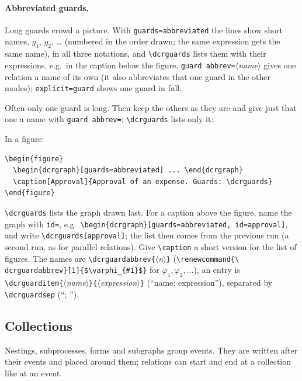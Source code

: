 \documentclass[a4paper,11pt]{article}
\newcommand\example[1]{%
  \begin{tcolorbox}[colback=white, colframe=black!25, boxrule=0.4pt,
      arc=1mm, left=2mm, right=2mm, halign lower=flush center]
    
    \tcblower
    
  \end{tcolorbox}}
\newcommand\cs[1]{\texttt{\textbackslash#1}}
\newcommand\key[1]{\texttt{#1}}
\newcommand\meta[1]{\ensuremath{\langle}\textit{#1}\ensuremath{\rangle}}
\newcommand\marg[1]{\texttt{\{}\meta{#1}\texttt{\}}}
\begin{document}
\paragraph{Abbreviated guards.} Long guards crowd a picture. With
\key{guards=abbreviated} the lines show short names, $g_1$, $g_2$, \dots{}
(numbered in the order drawn; the same expression gets the same name), in all
three notations, and \cs{dcrguards} lists them with their expressions, e.g.\
in the caption below the figure. \key{guard abbrev=}\meta{name} gives one
relation a name of its own (it also abbreviates that one guard in the other
modes); \key{explicit=guard} shows one guard in full.
\example{guard-abbrev}
Often only one guard is long. Then keep the others as they are and give just
that one a name with \key{guard abbrev=}; \cs{dcrguards} lists only it:
\example{guard-abbrev-one}
In a figure:
\begin{lstlisting}
\begin{figure}
  \begin{dcrgraph}[guards=abbreviated] ... \end{dcrgraph}
  \caption[Approval]{Approval of an expense. Guards: \dcrguards}
\end{figure}
\end{lstlisting}
\cs{dcrguards} lists the graph drawn last. For a caption above the figure,
name the graph with \key{id=}, e.g.\ \cs{begin\{dcrgraph\}[guards=abbreviated,
id=approval]}, and write \cs{dcrguards[approval]}; the list then comes from
the previous run (a second run, as for parallel relations). Give
\cs{caption} a short version for the list of figures. The names are
\cs{dcrguardabbrev}\marg{n} (\cs{renewcommand\{\textbackslash
dcrguardabbrev\}[1]\{\$\textbackslash varphi\_\{\#1\}\$\}} for
$\varphi_1, \varphi_2, \dots$), an entry is \cs{dcrguarditem}\marg{name}\marg{expression}
(``name: expression''), separated by \cs{dcrguardsep} (``; '').

\subsection{Collections}
Nestings, subprocesses, forms and subgraphs group
events. They are written after their events and placed around them;
relations can start and end at a collection like at an event.
\example{collections}
\end{document}
